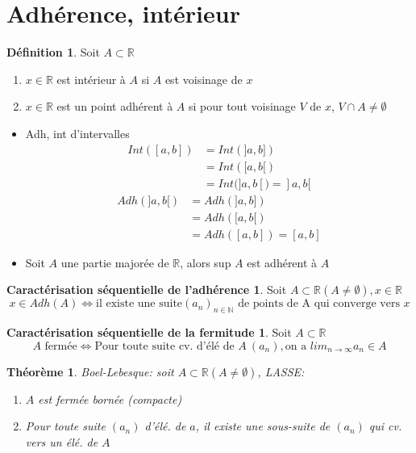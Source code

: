 \documentclass[fleqn]{article}
\theoremstyle{definition} \newtheorem*{defi}{D\'efinition}
\theoremstyle{definition} \newtheorem*{adh}{Caract\'erisation s\'equentielle de l'adh\'erence}
\theoremstyle{definition} \newtheorem*{fermitude}{Caract\'erisation s\'equentielle de la fermitude}
\theoremstyle{plain} \newtheorem*{theo}{Th\'eor\`eme}
\begin{document}
\section{Adh\'erence, int\'erieur}
\begin{defi}
	Soit $A \subset \mathbb{R}$
	\begin{enumerate}
		\item $x \in \mathbb{R}$ est int\'erieur \`a $A$ si $A$ est voisinage de $x$
		\item $x \in \mathbb{R}$ est un point adh\'erent \`a $A$ si pour tout voisinage $V$ de $x$, $V \cap A \neq \emptyset$ \\
	\end{enumerate}
\end{defi}
\begin{itemize}
	\item Adh, int d'intervalles
		\begin{align*}
			Int([a,b]) &= Int(]a,b]) \\
					   &= Int([a,b[) \\
					   &= Int(]a,b[) = ]a,b[
		\end{align*}
		\begin{align*}
			Adh(]a,b[) &= Adh(]a,b]) \\
					   &= Adh([a,b[) \\
					   &= Adh([a,b]) = [a,b]
		\end{align*}
	\item Soit $A$ une partie major\'ee de $\mathbb{R}$, alors sup $A$ est adh\'erent \`a $A$
\end{itemize}
\begin{adh}
	Soit $A \subset \mathbb{R} (A \neq \emptyset), x \in \mathbb{R}$
	\[x \in Adh(A) \Leftrightarrow \text{il existe une suite} (a_n)_{n \in \mathbb{N}} \text{ de points de A qui converge vers } x\]
\end{adh}
\begin{fermitude}
	Soit $A \subset \mathbb{R}$
	\[A \text{ ferm\'ee} \Leftrightarrow \text{Pour toute suite cv. d'\'el\'e de } A\ (a_n), \text{on a } lim_{n \to \infty} a_n \in A\]
\end{fermitude}
\begin{theo}
	Boel-Lebesque: soit $A \subset \mathbb{R} (A \neq \emptyset)$, LASSE:
	\begin{enumerate}
		\item $A$ est ferm\'ee born\'ee (compacte)
		\item Pour toute suite $(a_n)$ d'\'el\'e. de $a$, il existe une sous-suite de $(a_n)$ qui cv. vers un \'el\'e. de $A$
	\end{enumerate}
\end{theo}
\end{document}

